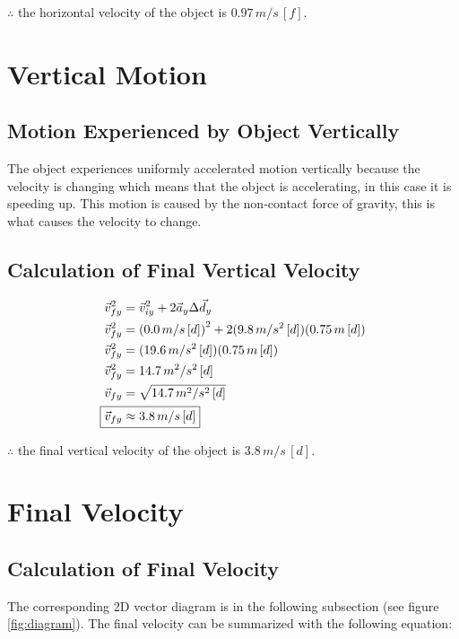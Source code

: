 \documentclass[12pt]{article}
\numberwithin{equation}{section}
\begin{document}
$\therefore$ the horizontal velocity of the object is $0.97\,m/s\,[f]$.

\section{Vertical Motion}

\subsection{Motion Experienced by Object Vertically}

The object experiences uniformly accelerated motion vertically because the velocity is changing which means that the object is accelerating, in this case it is speeding up. This motion is caused by the non-contact force of gravity, this is what causes the velocity to change.

\subsection{Calculation of Final Vertical Velocity}

\begin{align}
{\vec{v}_{fy}}^2&={\vec{v}_{iy}}^2+2\vec{a}_y\Delta{\vec{d}_y}\\
{\vec{v}_{fy}}^2&={(0.0\,m/s\,[d])}^2+2(9.8\,m/s^2\,[d])(0.75\,m\,[d])\\
{\vec{v}_{fy}}^2&=(19.6\,m/s^2\,[d])(0.75\,m\,[d])\\
{\vec{v}_{fy}}^2&=14.7\,m^2/s^2\,[d]\\
\vec{v}_{fy}&=\sqrt{14.7\,m^2/s^2\,[d]}\\
\Aboxed{\vec{v}_{fy}&\approx3.8\,m/s\,[d]}
\end{align}

$\therefore$ the final vertical velocity of the object is $3.8\,m/s\,[d]$.

\section{Final Velocity}

\subsection{Calculation of Final Velocity}

The corresponding 2D vector diagram is in the following subsection (see figure \ref{fig:diagram}). The final velocity can be summarized with the following equation:
\end{document}
